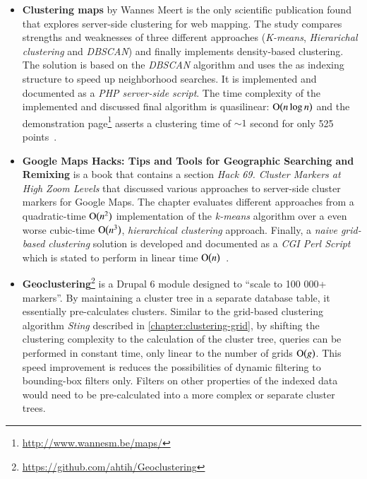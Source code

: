 \begin{itemize}

\item \textbf{Clustering maps} by Wannes Meert is the only scientific publication found that explores server-side clustering for web mapping. The study compares strengths and weaknesses of three different approaches (\textit{K-means}, \textit{Hierarichal clustering} and \textit{DBSCAN}) and finally implements density-based clustering. The solution is based on the \textit{DBSCAN} algorithm and uses the  as indexing structure to speed up neighborhood searches. It is implemented and documented as a \textit{PHP server-side script}. The time complexity of the implemented and discussed final algorithm is quasilinear: $\operatorname{O}\bigl(n \log{n}\bigr)$ and the demonstration page\footnote{\url{http://www.wannesm.be/maps/}} asserts a clustering time of $\sim 1$ second for only 525 points~\cite{Meert06clustermaps}.

\item \textbf{Google Maps Hacks: Tips and Tools for Geographic Searching and Remixing} is a book that contains a section \textit{Hack 69. Cluster Markers at High Zoom Levels} that discussed various approaches to server-side cluster markers for Google Maps. The chapter evaluates different approaches from a quadratic-time $\operatorname{O}\bigl(n^2\bigr)$ implementation of the \textit{k-means} algorithm over a even worse cubic-time $\operatorname{O}\bigl(n^3\bigr)$, \textit{hierarchical clustering} approach. Finally, a \textit{naive grid-based clustering} solution is developed and documented as a \textit{CGI Perl Script} which is stated to perform in linear time $\operatorname{O}\bigl(n\bigr)$~\cite{Gibson06Gmapshacks}.

\item \textbf{Geoclustering}\footnote{\url{https://github.com/ahtih/Geoclustering}} is a Drupal 6 module designed to ``scale to 100 000+ markers''. By maintaining a cluster tree in a separate database table, it essentially pre-calculates clusters. Similar to the grid-based clustering algorithm \textit{Sting} described in \ref{chapter:clustering-grid}, by shifting the clustering complexity to the calculation of the cluster tree, queries can be performed in constant time, only linear to the number of grids $\operatorname{O}\bigl(g\bigr)$. This speed improvement is reduces the possibilities of dynamic filtering to bounding-box filters only. Filters on other properties of the indexed data would need to be pre-calculated into a more complex or separate cluster trees. 

\end{itemize}

















